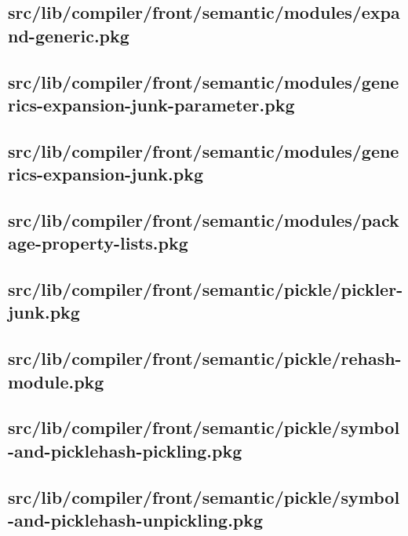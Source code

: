 \subsection{src/lib/compiler/front/semantic/modules/expand-generic.pkg}


\subsection{src/lib/compiler/front/semantic/modules/generics-expansion-junk-parameter.pkg}


\subsection{src/lib/compiler/front/semantic/modules/generics-expansion-junk.pkg}


\subsection{src/lib/compiler/front/semantic/modules/package-property-lists.pkg}


\subsection{src/lib/compiler/front/semantic/pickle/pickler-junk.pkg}


\subsection{src/lib/compiler/front/semantic/pickle/rehash-module.pkg}


\subsection{src/lib/compiler/front/semantic/pickle/symbol-and-picklehash-pickling.pkg}


\subsection{src/lib/compiler/front/semantic/pickle/symbol-and-picklehash-unpickling.pkg}



